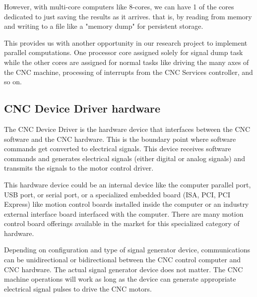 \begin{tcolorbox}[colback=green!15!white,colframe=red!75!black,title=Research consideration no. 1]
\justifying
However, with multi-core computers like 8-cores, we can have 1 of the cores dedicated to just saving the results as it arrives. that is, by reading from memory and writing to a file like a "memory dump" for persistent storage.  
\vspace*{1\baselineskip}

This provides us with another opportunity in our research project to implement parallel computations. One processor core assigned solely for signal dump task while the other cores are assigned for normal tasks like driving the many axes of the CNC machine, processing of interrupts from the CNC Services controller, and so on.  
\end{tcolorbox}

\pagebreak
\subsection{CNC Device Driver hardware}

The CNC Device Driver is the hardware device that interfaces between the CNC software and the CNC hardware. This is the boundary point where software commands get converted to electrical signals. This device receives software commands and generates electrical signals (either digital or analog signals) and transmits the signals to the motor control driver. \vspace*{1\baselineskip}
	
This hardware device could be an internal device like the computer parallel port, USB port, or serial port, or a specialized embedded board (ISA, PCI, PCI Express) like motion control boards installed inside the computer or an industry external interface board interfaced with the computer. There are many motion control board offerings available in the market for this specialized category of hardware.

\begin{tcolorbox}[colback=green!15!white,colframe=red!75!black,title=Research consideration no. 1]
\justifying	
Depending on configuration and type of signal generator device, communications can be unidirectional or bidirectional between the CNC control computer and CNC hardware. The actual signal generator device does not matter. The CNC machine operations will work as long as the device can generate appropriate electrical signal pulses to drive the CNC motors. 
\end{tcolorbox}

